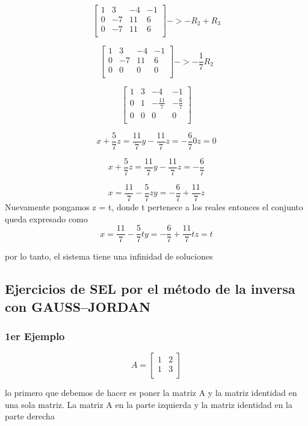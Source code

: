 \documentclass{article}
\begin{document}
\[
\begin{bmatrix}
 1 & 3 & -4 & -1  \\
 0 & -7 &11 & 6  \\
 0 & -7 & 11 & 6  \\
\end{bmatrix}
-> -R_2+ R_3
\]

\[
\begin{bmatrix}
 1 & 3 & -4 & -1  \\
 0 & -7 &11 & 6  \\
 0 & 0 & 0 & 0  \\
\end{bmatrix}
-> -\frac{1}{7}R_2
\]

\[
\begin{bmatrix}
 1 & 3 & -4 & -1  \\
 0 & 1 & -\frac{11}{7} & -\frac{6}{7}  \\
 0 & 0 & 0 & 0  \\
\end{bmatrix}
\]


\[
    x + \frac{5}{7}z = \frac{11}{7}
    y - \frac{11}{7}z = -\frac{6}{7}
    0z = 0
\]

\[
    x + \frac{5}{7}z = \frac{11}{7}
    y - \frac{11}{7}z = -\frac{6}{7}
\]

\[
    x = \frac{11}{7} - \frac{5}{7}z
    y = -\frac{6}{7} +\frac{11}{7}z 
\]
Nuevamente pongamos z = t, donde t pertenece a los reales entonces el conjunto queda expresado como
\[
    x = \frac{11}{7} - \frac{5}{7}t
    y = -\frac{6}{7} +\frac{11}{7}t
    z = t
\]

por lo tanto, el sistema tiene una infinidad de soluciones



\subsection{Ejercicios de SEL por el método de la inversa con GAUSS--JORDAN }


\subsubsection{1er Ejemplo}

\[
A =
\begin{bmatrix}
 1 & 2  \\
 1 & 3  \\
\end{bmatrix}
\]

lo primero que debemos de hacer es poner la matriz A y la matriz identidad en una 
sola matriz. La matriz A en la parte izquierda y la matriz identidad en la parte derecha
\end{document}
